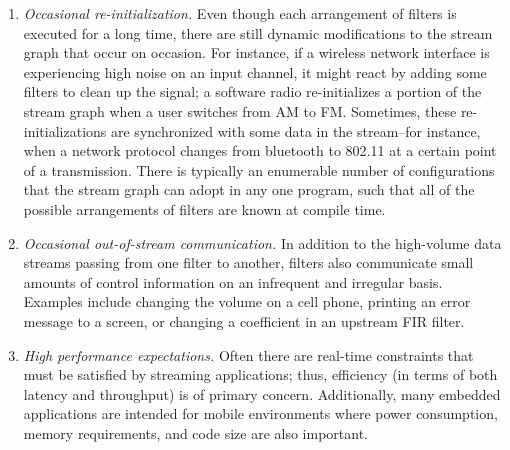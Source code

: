 \begin{enumerate}
\item {\it Occasional re-initialization.}  Even though each
arrangement of filters is executed for a long time, there are still
dynamic modifications to the stream graph that occur on occasion.  For
instance, if a wireless network interface is experiencing high noise
on an input channel, it might react by adding some filters to clean up
the signal; a software radio re-initializes a portion of the stream
graph when a user switches from AM to FM.  Sometimes, these
re-initializations are synchronized with some data in the stream--for
instance, when a network protocol changes from bluetooth to 802.11 at
a certain point of a transmission.  There is typically an enumerable
number of configurations that the stream graph can adopt in any one
program, such that all of the possible arrangements of filters are
known at compile time.

\item {\it Occasional out-of-stream communication.}  In addition to
the high-volume data streams passing from one filter to another,
filters also communicate small amounts of control information on an
infrequent and irregular basis.  Examples include changing the volume
on a cell phone, printing an error message to a screen, or changing a
coefficient in an upstream FIR filter.

\item {\it High performance expectations.}  Often there are real-time
constraints that must be satisfied by streaming applications; thus,
efficiency (in terms of both latency and throughput) is of primary
concern.  Additionally, many embedded applications are intended for
mobile environments where power consumption, memory requirements, and
code size are also important.
\end{enumerate}



 






